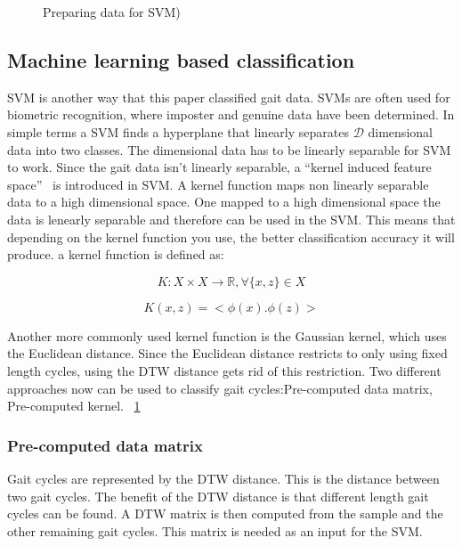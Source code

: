 \documentclass{sig-alternate}
\begin{document}
\begin{figure}
\centering
{}
\caption{Preparing data for SVM)}
\label{fig:TrainingData}
\end{figure}

\subsection{Machine learning based classification}
	SVM is another way that this paper classified gait data. SVMs are often used for biometric recognition, where imposter and genuine data have been determined. In simple terms a SVM finds a hyperplane that linearly separates \begin{math}\mathcal{D} \end{math} dimensional data into two classes. The dimensional data has to be linearly separable for SVM to work. Since the gait data isn't linearly separable, a ``kernel induced feature space''~\cite{Muaaz:2013} is introduced in SVM. A kernel function maps non linearly separable data to a high dimensional space. One mapped to a high dimensional space the data is lenearly separable and therefore can be used in the SVM. This means that depending on the kernel function you use, the better classification accuracy it will produce. a kernel function is defined as:

\begin{displaymath}
K : X \times X \rightarrow \mathbb{R}, \forall \{x,z\} \in X
\label{eq:KF1} 
\end{displaymath}

\begin{displaymath}
K(x,z)=< \phi (x).\phi(z) > 
\label{eq:KF2}
\end{displaymath}

Another more commonly used kernel function is the Gaussian kernel, which uses the Euclidean distance. Since the Euclidean distance restricts to only using fixed length cycles, using the DTW distance gets rid of this restriction. Two different approaches now can be used to classify gait cycles:Pre-computed data matrix, Pre-computed kernel. ~\ref{fig:TrainingData}

\subsubsection{Pre-computed data matrix}
	Gait cycles are represented by the DTW distance. This is the distance between two gait cycles. The benefit of the DTW distance is that different length gait cycles can be found. A DTW matrix is then computed from the sample and the other remaining gait cycles. This matrix is needed as an input for the SVM. 
\end{document}

